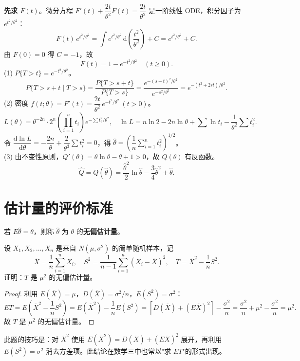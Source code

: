 \documentclass[lang=cn,11pt]{elegantbook}
\begin{document}
\begin{solution}
\textbf{先求 \(F(t)\)}。微分方程 \(F'(t) + \dfrac{2t}{\theta^2}F(t) = \dfrac{2t}{\theta^2}\) 是一阶线性 ODE，积分因子为 \(e^{t^2/\theta^2}\)：
\[
F(t)\,e^{t^2/\theta^2} = \int e^{t^2/\theta^2}\,\mathrm{d}\!\left(\frac{t^2}{\theta^2}\right) + C = e^{t^2/\theta^2} + C.
\]
由 \(F(0)=0\) 得 \(C=-1\)，故
\[
F(t) = 1 - e^{-t^2/\theta^2}\quad(t \geq 0).
\]
(1) \(P\{T > t\} = e^{-t^2/\theta^2}\)。
\[
P\{T > s+t \mid T > s\} = \frac{P\{T > s+t\}}{P\{T > s\}} = \frac{e^{-(s+t)^2/\theta^2}}{e^{-s^2/\theta^2}} = e^{-(t^2+2st)/\theta^2}.
\]
(2) 密度 \(f(t;\theta) = F'(t) = \dfrac{2t}{\theta^2}\,e^{-t^2/\theta^2}\ (t > 0)\)。
\[
L(\theta) = \theta^{-2n}\cdot 2^n\!\left(\prod_{i=1}^{n}t_i\right)e^{-\sum t_i^2/\theta^2},\quad
\ln L = n\ln 2 - 2n\ln\theta + \sum\ln t_i - \frac{1}{\theta^2}\sum t_i^2.
\]
令 \(\dfrac{\mathrm{d}\ln L}{\mathrm{d}\theta} = -\dfrac{2n}{\theta} + \dfrac{2}{\theta^3}\sum t_i^2 = 0\)，得 \(\hat{\theta} = \displaystyle\left(\dfrac{1}{n}\sum_{i=1}^{n}t_i^2\right)^{\!1/2}\)。\\
(3) 由不变性原则，\(Q'(\theta) = \theta\ln\theta - \theta + 1>0\)，故 \(Q(\theta)\) 有反函数。
\[
\hat{Q} = Q(\hat{\theta}) = \frac{\hat{\theta}^2}{2}\ln\hat{\theta} - \frac{3}{4}\hat{\theta}^2 + \hat{\theta}.
\]
\end{solution}



\section{估计量的评价标准} \label{subsec:criteria}

\begin{definition}[无偏性] \label{def:unbiased}
若 \(E\hat{\theta} = \theta\)，则称 \(\hat{\theta}\) 为 \(\theta\) 的\textbf{无偏估计量}。
\end{definition}

\begin{exercise}[无偏估计的构造与验证] \label{ex:unbiased_05}
设 \(X_1,X_2,\dots,X_n\) 是来自 \(N(\mu,\sigma^2)\) 的简单随机样本，记
\[
\overline{X}=\frac{1}{n}\sum_{i=1}^{n}X_i,\quad S^2=\frac{1}{n-1}\sum_{i=1}^{n}(X_i-\overline{X})^2,\quad T=\overline{X}^2-\frac{1}{n}S^2.
\]
证明：\(T\) 是 \(\mu^2\) 的无偏估计量。
\end{exercise}
\begin{solution}
\begin{proof}
利用 \(E(\overline{X})=\mu\)，\(D(\overline{X})=\sigma^2/n\)，\(E(S^2)=\sigma^2\)：
\[
ET=E\!\left(\overline{X}^2-\frac{1}{n}S^2\right)
=E(\overline{X}^2)-\frac{1}{n}E(S^2)
=\left[D(\overline{X})+(E\overline{X})^2\right]-\frac{\sigma^2}{n}
=\frac{\sigma^2}{n}+\mu^2-\frac{\sigma^2}{n}=\mu^2.
\]
故 \(T\) 是 \(\mu^2\) 的无偏估计量。
\end{proof}
\begin{note}
此题的技巧是：对 \(\overline{X}^2\) 使用 \(E(\overline{X}^2)=D(\overline{X})+(E\overline{X})^2\) 展开，再利用 \(E(S^2)=\sigma^2\) 消去方差项。此结论在数学三中也常以"求 \(ET\)"的形式出现。
\end{note}
\end{solution}
\end{document}
